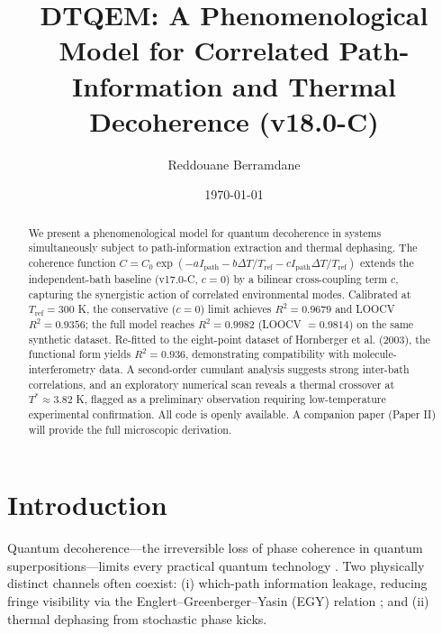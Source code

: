 \documentclass[aps,pra,reprint,amsmath,amssymb,superscriptaddress]{revtex4-2}
\begin{document}
\title{DTQEM: A Phenomenological Model for Correlated Path-Information and Thermal Decoherence (v18.0-C)}

\author{Reddouane Berramdane}

\date{\today}

\begin{abstract}
We present a phenomenological model for quantum decoherence in systems simultaneously subject to path-information extraction and thermal dephasing. The coherence function $C = C_0 \exp(-a I_{\text{path}} - b\Delta T/T_{\text{ref}} - c I_{\text{path}}\Delta T/T_{\text{ref}})$ extends the independent-bath baseline (v17.0-C, $c=0$) by a bilinear cross-coupling term $c$, capturing the synergistic action of correlated environmental modes. Calibrated at $T_{\text{ref}} = 300$ K, the conservative ($c=0$) limit achieves $R^2 = 0.9679$ and LOOCV $R^2 = 0.9356$; the full model reaches $R^2 = 0.9982$ (LOOCV $= 0.9814$) on the same synthetic dataset. Re-fitted to the eight-point dataset of Hornberger et al. (2003), the functional form yields $R^2 = 0.936$, demonstrating compatibility with molecule-interferometry data. A second-order cumulant analysis suggests strong inter-bath correlations, and an exploratory numerical scan reveals a thermal crossover at $T^* \approx 3.82$ K, flagged as a preliminary observation requiring low-temperature experimental confirmation. All code is openly available. A companion paper (Paper II) will provide the full microscopic derivation.
\end{abstract}

\maketitle

\section{Introduction}
Quantum decoherence---the irreversible loss of phase coherence in quantum superpositions---limits every practical quantum technology \cite{Breuer2002, Weiss2012}. Two physically distinct channels often coexist: (i) which-path information leakage, reducing fringe visibility via the Englert--Greenberger--Yasin (EGY) relation \cite{Englert1996}; and (ii) thermal dephasing from stochastic phase kicks.
\end{document}
